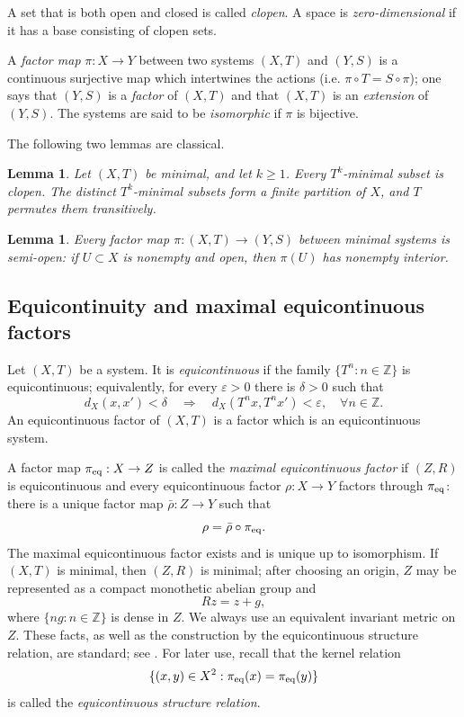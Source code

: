 \documentclass[reqno,12pt]{amsart}
\newtheorem{lemma}[thm]{Lemma}
\def \Z {\mathbb Z}
\numberwithin{equation}{section}
\begin{document}
A set that is both open and closed is called \emph{clopen}.  A space is
\emph{zero-dimensional} if it has a base consisting of clopen sets.


A {\em factor map} $\pi: X\rightarrow Y$ between two systems $(X,T)$
and $(Y, S)$ is a continuous surjective map which intertwines the
actions (i.e. $\pi\circ T= S\circ \pi$); one says that $(Y, S)$ is a {\it factor} of $(X,T)$ and
that $(X,T)$ is an {\it extension} of $(Y,S)$. The systems are said to be {\em isomorphic} if $\pi$ is bijective.

The following two lemmas are classical.

\begin{lemma}\cite[Theorem~3.1]{Ye92}\label{lem:power-components}
Let $(X,T)$ be minimal, and let $k\geq1$. Every
$T^k$-minimal subset is clopen. The distinct $T^k$-minimal subsets form a
finite partition of $X$, and $T$ permutes them transitively.
\end{lemma}


\begin{lemma}\cite[Theorem~1.15]{Auslander88}\label{lem:semiopen}
Every factor map $\pi:(X,T)\to(Y,S)$ between minimal systems is semi-open: if $U\subset X$ is nonempty and open, then
$\pi(U)$ has nonempty interior.
\end{lemma}

\subsection{Equicontinuity and maximal equicontinuous factors}

Let $(X,T)$ be a system. It is
\emph{equicontinuous} if the family $\{T^n:n\in\Z\}$ is equicontinuous;
equivalently, for every $\varepsilon>0$ there is $\delta>0$ such that
\[
 d_X(x,x')<\delta
 \quad\Longrightarrow\quad
 d_X(T^nx,T^nx')<\varepsilon, \quad \forall n\in\Z.
\]
An equicontinuous factor of $(X,T)$ is a factor which is an
equicontinuous system.

A factor map $\pi_{\rm eq}:X\to Z$ is called the \emph{maximal
equicontinuous factor} if $(Z,R)$ is equicontinuous and every
equicontinuous factor $\rho:X\to Y$ factors through $\pi_{\rm eq}$:
there is a unique factor map $\bar\rho:Z\to Y$ such that
\[
 \rho=\bar\rho\circ\pi_{\rm eq}.
\]
The maximal equicontinuous factor exists and is unique up to isomorphism.
If $(X,T)$ is minimal, then $(Z,R)$ is minimal; after choosing an origin,
$Z$ may be represented as a compact monothetic abelian group and
\[
 Rz=z+g,
\]
where $\{ng:n\in\Z\}$ is dense in $Z$.  We always use an equivalent
invariant metric on $Z$.  These facts, as well as the construction by the
equicontinuous structure relation, are standard; see
\cite[Chapter~2, pp.~35--48]{Auslander88}.
For later use, recall that the kernel relation
\[
 \{(x,y)\in X^2:\pi_{\rm eq}(x)=\pi_{\rm eq}(y)\}
\]
is called the \emph{equicontinuous structure relation}.
\end{document}
